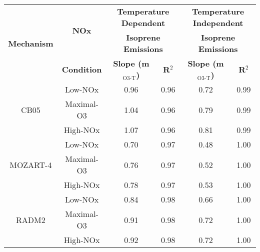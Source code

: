 {\renewcommand{\arraystretch}{1.2}
\begin{tabular}{c|c|c|c|c|c}
	\hline\hline
	\multirow{3}{*}{\textbf{Mechanism}} & \multirow{2}{*}{\textbf{NOx}} & \multicolumn{2}{c|}{\textbf{Temperature Dependent}} & \multicolumn{2}{c}{\textbf{Temperature Independent}} \\ 
	 & & \multicolumn{2}{c|}{\textbf{Isoprene Emissions}} &  \multicolumn{2}{c}{\textbf{Isoprene Emissions}} \\ \cline{3-6} 
	 & \textbf{Condition} & \textbf{Slope (m$_{\text{O3-T}}$)} & \textbf{R$^2$} & \textbf{Slope (m$_{\text{O3-T}}$)} & \textbf{R$^2$} \\ 
	\hline\hline
	\multirow{3}{*}{CB05} & Low-NOx & 0.96 & 0.96 & 0.72 & 0.99 \\ 
	 & Maximal-O3 & 1.04 & 0.96 & 0.79 & 0.99 \\ 
	 & High-NOx & 1.07 & 0.96 & 0.81 & 0.99 \\ 
	\hline
	\multirow{3}{*}{MOZART-4} & Low-NOx & 0.70 & 0.97 & 0.48 & 1.00 \\ 
	 & Maximal-O3 & 0.76 & 0.97 & 0.52 & 1.00 \\ 
	 & High-NOx & 0.78 & 0.97 & 0.53 & 1.00 \\ 
	\hline
	\multirow{3}{*}{RADM2} & Low-NOx & 0.84 & 0.98 & 0.66 & 1.00 \\ 
	 & Maximal-O3 & 0.91 & 0.98 & 0.72 & 1.00 \\ 
	 & High-NOx & 0.92 & 0.98 & 0.72 & 1.00 \\ 
	\hline
	\hline\hline
\end{tabular}}
